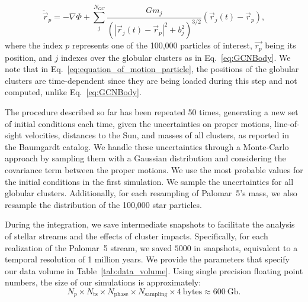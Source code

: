 \begin{enumerate}
                \begin{equation}
                    \ddot{\vec{r}}_p = -\nabla \Phi + \left.\sum_{j}^{N_{GC}} \frac{Gm_j}{\left(|\vec{r}_j(t) - \vec{r}_p|^2 + b_j^2\right)^{3/2}}\right. \left(\vec{r}_j(t)- \vec{r}_p\right),
                \end{equation} \label{eq:equation_of_motion_particle} where the index $p$ represents one of the 100,000 particles of interest, $\vec{r_p}$ being its position, and $j$ indexes over the globular clusters as in Eq.~\ref{eq:GCNBody}. We note that in Eq.~\ref{eq:equation_of_motion_particle}, the positions of the globular clusters are time-dependent since they are being loaded during this step and not computed, unlike Eq.~\ref{eq:GCNBody}. 
            \end{enumerate}

            The procedure described so far has been repeated 50 times, generating a new set of initial conditions each time, given the uncertainties on proper motions, line-of-sight velocities, distances to the Sun, and masses of all clusters, as reported in the Baumgardt catalog. We handle these uncertainties through a Monte-Carlo approach by sampling them with a Gaussian distribution and considering the covariance term between the proper motions. We use the most probable values for the initial conditions in the first simulation. We sample the uncertainties for all globular clusters. Additionally, for each resampling of Palomar~5's mass, we also resample the distribution of the 100,000 star particles. 

            During the integration, we save intermediate snapshots to facilitate the analysis of stellar streams and the effects of cluster impacts. Specifically, for each realization of the Palomar~5 stream, we saved $5000$ in snapshots, equivalent to a temporal resolution of 1 million years. We provide the parameters that specify our data volume in Table~\ref{tab:data_volume}. Using single precision floating point numbers, the size of our simulations is approximately:
            \begin{equation} \label{eq:data_volume_estimate}
                N_p \times N_{\textrm{ts}}\times N_{\textrm{phase}}\times N_{\textrm{sampling}} \times 4~\textrm{bytes}\approx 600~\textrm{Gb}.
            \end{equation}

